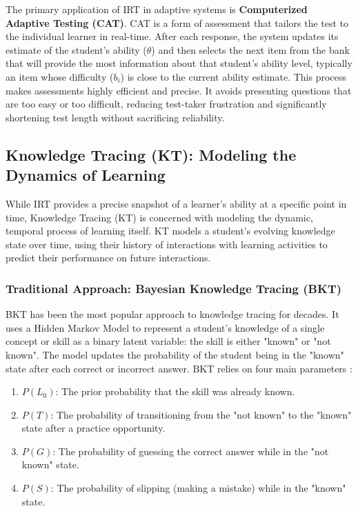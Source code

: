 \documentclass{article}
\begin{document}
The primary application of IRT in adaptive systems is \textbf{Computerized Adaptive Testing (CAT)}. CAT is a form of assessment that tailors the test to the individual learner in real-time.\cite{68, 76} After each response, the system updates its estimate of the student's ability ($ \theta $) and then selects the next item from the bank that will provide the most information about that student's ability level, typically an item whose difficulty ($b_i$) is close to the current ability estimate.\cite{72, 77} This process makes assessments highly efficient and precise. It avoids presenting questions that are too easy or too difficult, reducing test-taker frustration and significantly shortening test length without sacrificing reliability.\cite{68, 76, 78}

\subsection{Knowledge Tracing (KT): Modeling the Dynamics of Learning}

While IRT provides a precise snapshot of a learner's ability at a specific point in time, Knowledge Tracing (KT) is concerned with modeling the dynamic, temporal process of learning itself. KT models a student's evolving knowledge state over time, using their history of interactions with learning activities to predict their performance on future interactions.\cite{79, 80, 81}

\subsubsection{Traditional Approach: Bayesian Knowledge Tracing (BKT)}

BKT has been the most popular approach to knowledge tracing for decades.\cite{80} It uses a Hidden Markov Model to represent a student's knowledge of a single concept or skill as a binary latent variable: the skill is either "known" or "not known".\cite{80, 81} The model updates the probability of the student being in the "known" state after each correct or incorrect answer. BKT relies on four main parameters \cite{81}:
\begin{enumerate}
    \item $P(L_0)$: The prior probability that the skill was already known.
    \item $P(T)$: The probability of transitioning from the "not known" to the "known" state after a practice opportunity.
    \item $P(G)$: The probability of guessing the correct answer while in the "not known" state.
    \item $P(S)$: The probability of slipping (making a mistake) while in the "known" state.
\end{enumerate}
\end{document}

